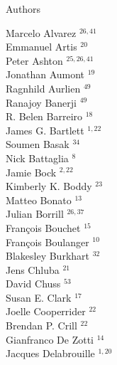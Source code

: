 \documentclass[PICOReport.tex]{subfiles}
\begin{document}
\Large  {\centerline {Authors}}
%
\footnotesize {
\begin{multicols}{4}
Marcelo Alvarez $^{26,41}$                 \\
Emmanuel Artis $^{20}$                  \\
Peter Ashton $^{25,26,41}$                    \\
Jonathan Aumont $^{19}$                 \\
Ragnhild Aurlien $^{49}$                 \\
Ranajoy Banerji $^{49}$                 \\
R. Belen Barreiro $^{18}$               \\
James G. Bartlett $^{1,22}$               \\
Soumen Basak $^{34}$                    \\
Nick Battaglia $^{8}$                  \\
Jamie Bock $^{2,22}$                      \\
Kimberly K. Boddy $^{23}$               \\
Matteo Bonato $^{13}$                   \\
Julian Borrill $^{26,37}$                  \\
Fran\c{c}ois Bouchet $^{15}$            \\
Fran\c{c}ois Boulanger $^{10}$          \\
Blakesley Burkhart $^{32}$              \\
Jens Chluba $^{21}$                     \\
David Chuss $^{53}$                     \\
Susan E. Clark $^{17}$                  \\
Joelle Cooperrider $^{22}$              \\
Brendan P. Crill $^{22}$                \\
Gianfranco De Zotti $^{14}$             \\
Jacques Delabrouille $^{1,20}$            \\

\end{multicols}}
\end{document}
